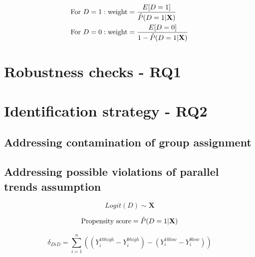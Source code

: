 \begin{equation}
    \label{eq:stabilisied_weights}
    \begin{aligned}
        \textnormal{For } D &= 1: \textnormal{weight} = \frac{E[D = 1]}{\hat{P}(D = 1 | \textbf{X})} \\
        \textnormal{For } D &= 0: \textnormal{weight} = \frac{E[D = 0]}{1 - \hat{P}(D = 1 | \textbf{X})}
    \end{aligned}
\end{equation}


\section{Robustness checks - RQ1}



\section{Identification strategy - RQ2}


\subsection{Addressing contamination of group assignment}



\subsection{Addressing possible violations of parallel trends assumption}

\begin{equation}
    \label{eq:logit_rq2}
    Logit(D) \sim \textbf{X}
\end{equation}

\begin{equation}
    \label{eq:propensity_score_rq2}
    \textnormal{Propensity score} = \hat{P}(D = 1 | \textbf{X})
\end{equation}


\begin{equation}
    \label{eq:did}
    \delta_{DiD} = \sum_{i=1}^{n} \left( (Y_{i}^{10high} - Y_{i}^{9high}) - (Y_{i}^{10low} - Y_{i}^{9low}) \right)
\end{equation}